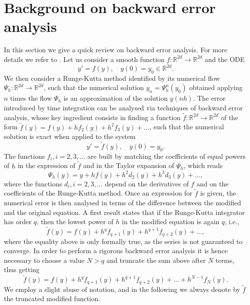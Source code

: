 \documentclass{siamart1116}
\numberwithin{theorem}{section}
\newcommand{\R}{\mathbb{R}}
\begin{document}
\section{Background on backward error analysis}\label{sec:BEA} In this section we give a quick review on backward error analysis. For more details we refer to \cite{HLW06, LeR04, SaC94}. Let us consider a smooth function $f \colon \R^{2d} \to \R^{2d}$ and the ODE
\begin{equation}
	y' = f(y), \quad y(0) = y_0 \in \R^{2d}.
\end{equation}
We then consider a Runge-Kutta method identified by its numerical flow $\Psi_h \colon \R^{2d} \to \R^{2d}$, such that the numerical solution $y_n = \Psi_h^n(y_0)$ obtained applying $n$ times the flow $\Psi_h$ is an approximation of the solution $y(nh)$. The error introduced by time integration can be analysed via techniques of backward error analysis, whose key ingredient consists in finding a function $\tilde f\colon \R^{2d} \to \R^{2d}$ of the form $\tilde f(y) = f(y) + hf_2(y) + h^2 f_3(y) + \ldots$, such that the numerical solution is exact when applied to the system 
\begin{equation}
	y' = \tilde f(y), \quad y(0) = y_0.
\end{equation}
The functions $f_i, i = 2, 3, \ldots$ are built by matching the coefficients of equal powers of $h$ in the expression of $\tilde f$ and in the Taylor expansion of $\Psi_h$, which reads
\begin{equation}
	\Psi_h(y) = y + h f(y) + h^2 d_2(y) + h^3 d_3(y) + \ldots,  
\end{equation}
where the functions $d_i, i = 2, 3, \ldots$ depend on the derivatives of $f$ and on the coefficients of the Runge-Kutta method. Once an expression for $\tilde f$ is given, the numerical error is then analysed in terms of the difference between the modified and the original equation. A first result states that if the Runge-Kutta integrator has order $q$, then the lowest power of $h$ in the modified equation is again $q$, i.e.,
\begin{equation}
	\tilde f(y) = f(y) + h^q f_{q+1}(y) + h^{q+1} f_{q+2}(y) + \ldots,
\end{equation}
where the equality above is only formally true, as the series is not guaranteed to converge. In order to perform a rigorous backward error analysis it is hence necessary to choose a value $N > q$ and truncate the sum above after $N$ terms, thus getting
\begin{equation}
	\tilde f(y) = f(y) + h^q f_{q+1}(y) + h^{q+1} f_{q+2}(y) + \ldots + h^{N-1}f_N(y).
\end{equation}
We employ a slight abuse of notation, and in the following we always denote by $\tilde f$ the truncated modified function. 
\end{document}
